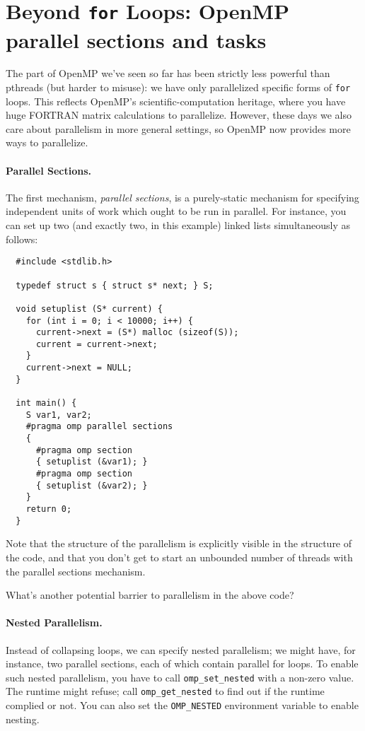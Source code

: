 \section*{Beyond {\tt for} Loops: OpenMP parallel sections and tasks}
The part of OpenMP we've seen so far has been strictly less powerful
than pthreads (but harder to misuse): we have only parallelized
specific forms of {\tt for} loops. This reflects OpenMP's
scientific-computation heritage, where you have huge FORTRAN matrix
calculations to parallelize. However, these days we also care about
parallelism in more general settings, so OpenMP now provides
more ways to parallelize.

\paragraph{Parallel Sections.} The first mechanism, \emph{parallel sections},
is a purely-static mechanism for specifying independent units of work
which ought to be run in parallel. For instance, you can set up two 
(and exactly two, in this example) linked lists simultaneously as follows:

{\small
\begin{verbatim}
  #include <stdlib.h>

  typedef struct s { struct s* next; } S;

  void setuplist (S* current) {
    for (int i = 0; i < 10000; i++) {
      current->next = (S*) malloc (sizeof(S));
      current = current->next;
    }
    current->next = NULL;
  }

  int main() {
    S var1, var2;
    #pragma omp parallel sections
    {
      #pragma omp section
      { setuplist (&var1); }
      #pragma omp section
      { setuplist (&var2); }
    }
    return 0;
  }
\end{verbatim}
}
Note that the structure of the parallelism is explicitly visible in the
structure of the code, and that you don't get to start an unbounded 
number of threads with the parallel sections mechanism.

{\sf What's another potential barrier to parallelism in the above code?}\\

\paragraph{Nested Parallelism.} Instead of collapsing loops, we can
specify nested parallelism; we might have, for instance, two parallel
sections, each of which contain parallel for loops. To enable
such nested parallelism, you have to call \verb+omp_set_nested+ with
a non-zero value. The runtime might refuse; call \verb+omp_get_nested+ to
find out if the runtime complied or not. You can also set the 
\verb+OMP_NESTED+ environment variable to enable nesting.

